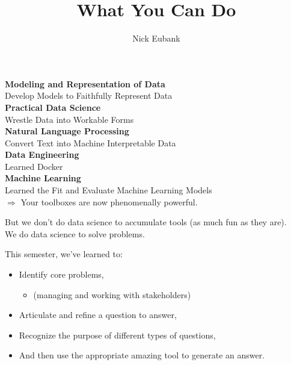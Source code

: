 \documentclass[11pt]{beamer}
\title{What You Can Do}
\author{\small Nick Eubank}
\date{\vspace*{.3in} \date}
\begin{document}
\begin{frame}[c]
\maketitle
\end{frame}

\begin{frame}[c]
    \centering
    \textbf{Modeling and Representation of Data} \\
    Develop Models to Faithfully Represent Data \\
    \vspace*{0.2cm}
    \pause \textbf{Practical Data Science} \\
    Wrestle Data into Workable Forms \\
    \vspace*{0.2cm}
    \pause \textbf{Natural Language Processing} \\
    Convert Text into Machine Interpretable Data \\
    \vspace*{0.2cm}
    \pause \textbf{Data Engineering} \\
    Learned Docker  \\
    \vspace*{0.2cm}
    \pause \textbf{Machine Learning} \\
    Learned the Fit and Evaluate Machine Learning Models \\
    \vspace*{0.2cm}
    \pause $\Rightarrow$ Your toolboxes are now \alert{phenomenally powerful.}
\end{frame}


\begin{frame}[c]
But we don't do data science to accumulate tools (as much fun as they are). \\
\pause We do data science to \alert{solve problems.} \\
\end{frame}


\begin{frame}[c]
\pause This semester, we've learned to:
\begin{itemize}
    \pause \item Identify \alert{core problems},
    \begin{itemize}
        \pause \item (managing and working with stakeholders)
    \end{itemize}
    \pause \item Articulate and refine a question to answer,
    \pause \item Recognize the purpose of different \alert{types of questions},
    \pause \item And then use the \alert{appropriate} amazing tool to generate an answer.
\end{itemize}
\end{frame}
\end{document}
